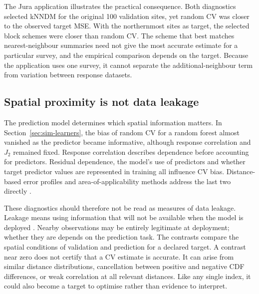 The Jura application illustrates the practical consequence. Both diagnostics selected kNNDM for the original 100 validation sites, yet random CV was closer to the observed target MSE. With the northernmost sites as target, the selected block schemes were closer than random CV. The scheme that best matches nearest-neighbour summaries need not give the most accurate estimate for a particular survey, and the empirical comparison depends on the target. Because the application uses one survey, it cannot separate the additional-neighbour term from variation between response datasets.

\subsection{Spatial proximity is not data leakage}
The prediction model determines which spatial information matters. In Section~\ref{sec:sim-learners}, the bias of random CV for a random forest almost vanished as the predictor became informative, although response correlation and $J_2$ remained fixed. Response correlation describes dependence before accounting for predictors. Residual dependence, the model's use of predictors and whether target predictor values are represented in training all influence CV bias. Distance-based error profiles and area-of-applicability methods address the last two directly \citep{brenning2023profiles,meyer2021aoa}.

These diagnostics should therefore not be read as measures of data leakage. Leakage means using information that will not be available when the model is deployed \citep{kaufman2012leakage}. Nearby observations may be entirely legitimate at deployment; whether they are depends on the prediction task. The contrasts compare the spatial conditions of validation and prediction for a declared target. A contrast near zero does not certify that a CV estimate is accurate. It can arise from similar distance distributions, cancellation between positive and negative CDF differences, or weak correlation at all relevant distances. Like any single index, it could also become a target to optimise rather than evidence to interpret.

